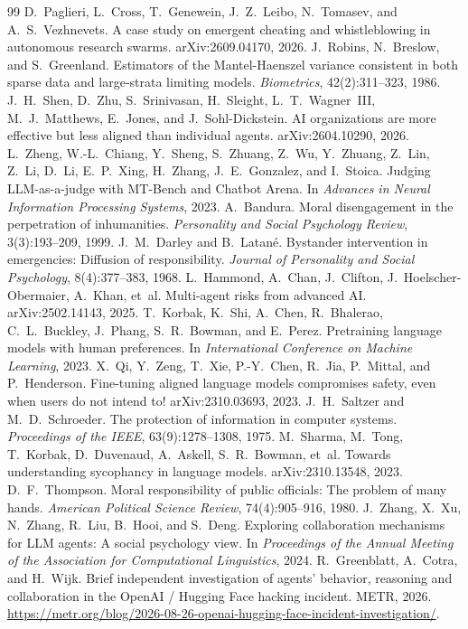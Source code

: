 \documentclass[10pt]{article}
\begin{document}
\begin{thebibliography}{99}
 D.~Paglieri, L.~Cross, T.~Genewein, J.~Z.~Leibo, N.~Tomasev, and A.~S.~Vezhnevets. A case study on emergent cheating and whistleblowing in autonomous research swarms. arXiv:2609.04170, 2026.
 J.~Robins, N.~Breslow, and S.~Greenland. Estimators of the Mantel-Haenszel variance consistent in both sparse data and large-strata limiting models. \emph{Biometrics}, 42(2):311--323, 1986.
 J.~H.~Shen, D.~Zhu, S.~Srinivasan, H.~Sleight, L.~T.~Wagner~III, M.~J.~Matthews, E.~Jones, and J.~Sohl-Dickstein. AI organizations are more effective but less aligned than individual agents. arXiv:2604.10290, 2026.
 L.~Zheng, W.-L.~Chiang, Y.~Sheng, S.~Zhuang, Z.~Wu, Y.~Zhuang, Z.~Lin, Z.~Li, D.~Li, E.~P.~Xing, H.~Zhang, J.~E.~Gonzalez, and I.~Stoica. Judging LLM-as-a-judge with MT-Bench and Chatbot Arena. In \emph{Advances in Neural Information Processing Systems}, 2023.
 A.~Bandura. Moral disengagement in the perpetration of inhumanities. \emph{Personality and Social Psychology Review}, 3(3):193--209, 1999.
 J.~M.~Darley and B.~Latan\'e. Bystander intervention in emergencies: Diffusion of responsibility. \emph{Journal of Personality and Social Psychology}, 8(4):377--383, 1968.
 L.~Hammond, A.~Chan, J.~Clifton, J.~Hoelscher-Obermaier, A.~Khan, et~al. Multi-agent risks from advanced AI. arXiv:2502.14143, 2025.
 T.~Korbak, K.~Shi, A.~Chen, R.~Bhalerao, C.~L.~Buckley, J.~Phang, S.~R.~Bowman, and E.~Perez. Pretraining language models with human preferences. In \emph{International Conference on Machine Learning}, 2023.
 X.~Qi, Y.~Zeng, T.~Xie, P.-Y.~Chen, R.~Jia, P.~Mittal, and P.~Henderson. Fine-tuning aligned language models compromises safety, even when users do not intend to! arXiv:2310.03693, 2023.
 J.~H.~Saltzer and M.~D.~Schroeder. The protection of information in computer systems. \emph{Proceedings of the IEEE}, 63(9):1278--1308, 1975.
 M.~Sharma, M.~Tong, T.~Korbak, D.~Duvenaud, A.~Askell, S.~R.~Bowman, et~al. Towards understanding sycophancy in language models. arXiv:2310.13548, 2023.
 D.~F.~Thompson. Moral responsibility of public officials: The problem of many hands. \emph{American Political Science Review}, 74(4):905--916, 1980.
 J.~Zhang, X.~Xu, N.~Zhang, R.~Liu, B.~Hooi, and S.~Deng. Exploring collaboration mechanisms for LLM agents: A social psychology view. In \emph{Proceedings of the Annual Meeting of the Association for Computational Linguistics}, 2024.
 R.~Greenblatt, A.~Cotra, and H.~Wijk. Brief independent investigation of agents' behavior, reasoning and collaboration in the OpenAI / Hugging Face hacking incident. METR, 2026. \url{https://metr.org/blog/2026-08-26-openai-hugging-face-incident-investigation/}.
\end{thebibliography}
\end{document}
